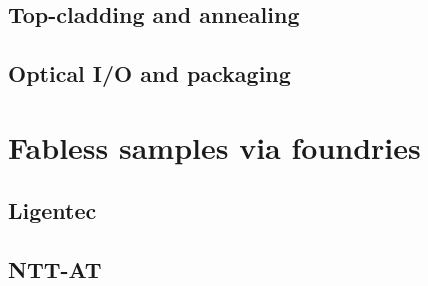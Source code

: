 \subsection{Top-cladding and annealing}
\subsection{Optical I/O and packaging}

\section{Fabless samples via foundries}

\subsection{Ligentec}

\subsection{NTT-AT}

